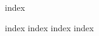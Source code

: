 \documentclass[
    a5paper, %
    openright, %
    twoside, %
    english, %
    brazil, %
    chapter=TITLE,
    section=TITLE,
]{abntex2}
\begin{document}
\sffamily

\pretextual

{index}

\textual

{index}
{index}
{index}
{index}

\printbibliography

\end{document}
